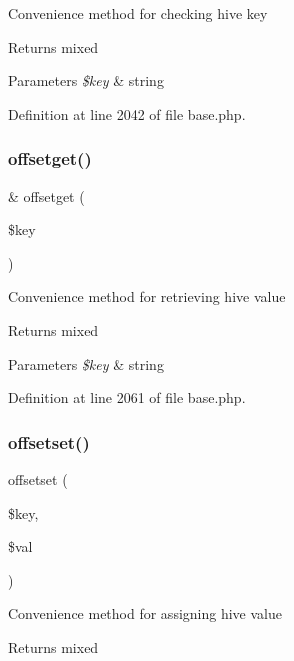 Convenience method for checking hive key \begin{DoxyReturn}{Returns}
mixed 
\end{DoxyReturn}

\begin{DoxyParams}{Parameters}
{\em \$key} & string \\
\hline
\end{DoxyParams}


Definition at line 2042 of file base.\+php.

\hypertarget{class_base_a4736f7355697c49bcd06b643b4077e8a}{}\label{class_base_a4736f7355697c49bcd06b643b4077e8a} 
\subsubsection{\texorpdfstring{offsetget()}{offsetget()}}
{\footnotesize\ttfamily \& offsetget (\begin{DoxyParamCaption}\item[{}]{\$key }\end{DoxyParamCaption})}

Convenience method for retrieving hive value \begin{DoxyReturn}{Returns}
mixed 
\end{DoxyReturn}

\begin{DoxyParams}{Parameters}
{\em \$key} & string \\
\hline
\end{DoxyParams}


Definition at line 2061 of file base.\+php.

\hypertarget{class_base_a67693a9cff0abdfbbd353c36c00fb8d3}{}\label{class_base_a67693a9cff0abdfbbd353c36c00fb8d3} 
\subsubsection{\texorpdfstring{offsetset()}{offsetset()}}
{\footnotesize\ttfamily offsetset (\begin{DoxyParamCaption}\item[{}]{\$key,  }\item[{}]{\$val }\end{DoxyParamCaption})}

Convenience method for assigning hive value \begin{DoxyReturn}{Returns}
mixed 
\end{DoxyReturn}

